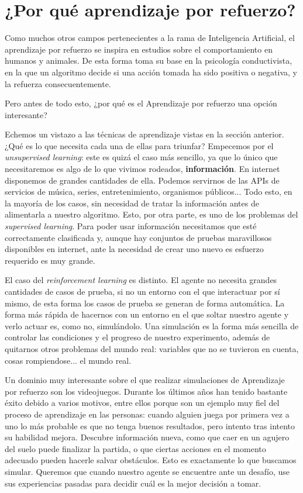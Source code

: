 \section{¿Por qué aprendizaje por refuerzo?}
Como muchos otros campos pertenecientes a la rama de Inteligencia Artificial, el aprendizaje por refuerzo se inspira en estudios sobre el comportamiento en humanos y animales. De esta forma toma su base en la psicología conductivista, en la que un algoritmo decide si una acción tomada ha sido positiva o negativa, y la refuerza consecuentemente.

Pero antes de todo esto, ¿por qué es el Aprendizaje por refuerzo una opción interesante?

Echemos un vistazo a las técnicas de aprendizaje vistas en la sección anterior. ¿Qué es lo que necesita cada una de ellas para triunfar? Empecemos por el \textit{unsupervised learning}: este es quizá el caso más sencillo, ya que lo único que necesitaremos es algo de lo que vivimos rodeados, \textbf{información}. En internet disponemos de grandes cantidades de ella. Podemos servirnos de las APIs de servicios de música, series, entretenimiento, organismos públicos... Todo esto, en la mayoría de los casos, sin necesidad de tratar la información antes de alimentarla a nuestro algoritmo. Esto, por otra parte, es uno de los problemas del \textit{supervised learning}. Para poder usar información necesitamos que esté correctamente clasificada y, aunque hay conjuntos de pruebas maravillosos disponibles en internet, ante la necesidad de crear uno nuevo es esfuerzo requerido es muy grande.

El caso del \textit{reinforcement learning} es distinto. El agente no necesita grandes cantidades de casos de prueba, si no un entorno con el que interactuar por sí mismo, de esta forma los casos de prueba se generan de forma automática. La forma más rápida de hacernos con un entorno en el que soltar nuestro agente y verlo actuar es, como no, simulándolo. Una simulación es la forma más sencilla de controlar las condiciones y el progreso de nuestro experimento, además de quitarnos otros problemas del mundo real: variables que no se tuvieron en cuenta, cosas rompiendose... el mundo real.

Un dominio muy interesante sobre el que realizar simulaciones de Aprendizaje por refuerzo son los videojuegos. Durante los últimos años han tenido bastante éxito debido a varios motivos, entre ellos porque son un ejemplo muy fiel del proceso de aprendizaje en las personas: cuando alguien juega por primera vez a uno lo más probable es que no tenga buenos resultados, pero intento tras intento su habilidad mejora. Descubre información nueva, como que caer en un agujero del suelo puede finalizar la partida, o que ciertas acciones en el momento adecuado pueden hacerle salvar obstáculos. Esto es exactamente lo que buscamos simular. Queremos que cuando nuestro agente se encuentre ante un desafío, use sus experiencias pasadas para decidir cuál es la mejor decisión a tomar.

